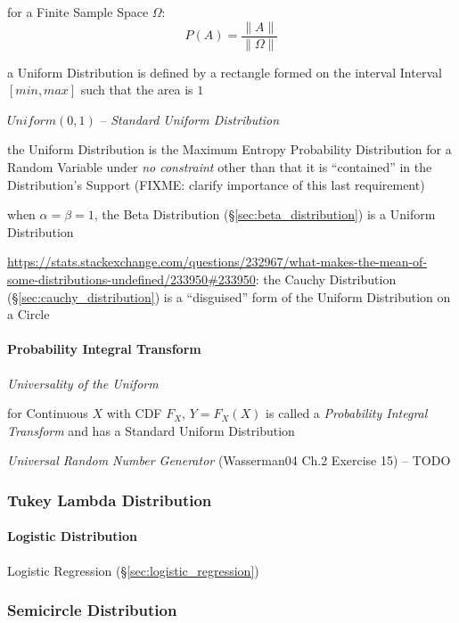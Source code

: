 for a Finite Sample Space $\Omega$:
\[
  P(A) = \frac{\|A\|}{\|\Omega\|}
\]

a Uniform Distribution is defined by a rectangle formed on the interval Interval
$[min,max]$ such that the area is $1$

$Uniform(0,1)$ -- \emph{Standard Uniform Distribution}

the Uniform Distribution is the Maximum Entropy Probability Distribution for a
Random Variable under \emph{no constraint} other than that it is ``contained''
in the Distribution's Support (FIXME: clarify importance of this last
requirement)

when $\alpha = \beta = 1$, the Beta Distribution (\S\ref{sec:beta_distribution})
is a Uniform Distribution

\url{https://stats.stackexchange.com/questions/232967/what-makes-the-mean-of-some-distributions-undefined/233950#233950}:
the Cauchy Distribution (\S\ref{sec:cauchy_distribution}) is a ``disguised''
form of the Uniform Distribution on a Circle



\paragraph{Probability Integral Transform}
\label{sec:probability_integral_transform}\hfill

\emph{Universality of the Uniform}

for Continuous $X$ with CDF $F_X$, $Y = F_X(X)$ is called a \emph{Probability
  Integral Transform} and has a Standard Uniform Distribution

\emph{Universal Random Number Generator} (Wasserman04 Ch.2 Exercise 15) -- TODO



\subsubsection{Tukey Lambda Distribution}\label{sec:tukey_lambda_distribution}

\paragraph{Logistic Distribution}\label{sec:logistic_distribution}\hfill

\fist Logistic Regression (\S\ref{sec:logistic_regression})



\subsubsection{Semicircle Distribution}\label{sec:semicircle_distribution}

